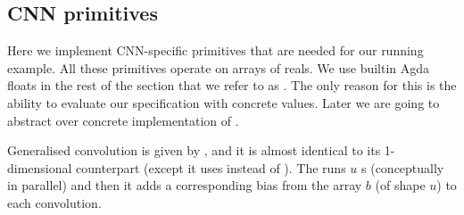 \subsection{CNN primitives\label{sec:ar-cnn-prim}}
Here we implement CNN-specific primitives that are needed for our running example.
All these primitives operate on arrays of reals.  We use builtin Agda floats in
the rest of the section that we refer to as .  The only reason for this
is the ability to evaluate our specification with concrete values.
Later we are going to abstract over concrete implementation of .

Generalised convolution is given by , and it is almost identical to its
1-dimensional counterpart (except it uses  instead of ).
The  runs $u$ s (conceptually in parallel) and then it adds a
corresponding bias from the array $b$ (of shape $u$) to each convolution.
\begin{code}[hide]%
\>[0]\AgdaSpace{}%
\AgdaSpace{}%
\<%
\\
\>[0][@{}l@{\AgdaIndent{0}}]%
\>[2]\AgdaSpace{}%
\AgdaSpace{}%
\AgdaSpace{}%
\AgdaSpace{}%
\AgdaSpace{}%
\AgdaSpace{}%
\AgdaSymbol{(}\AgdaSymbol{)}\<%
\\
%
\>[2]\AgdaSpace{}%
\AgdaSpace{}%
\AgdaSpace{}%
\AgdaSpace{}%
\AgdaSpace{}%
\AgdaSpace{}%
\AgdaSymbol{(}\AgdaPrimitive{\AgdaUnderscore{}+\AgdaUnderscore{}}\AgdaSymbol{;}\AgdaSpace{}%
\AgdaPrimitive{\AgdaUnderscore{}*\AgdaUnderscore{}}\AgdaSymbol{;}\AgdaSpace{}%
\AgdaSymbol{;}\AgdaSpace{}%
\AgdaSymbol{;}\AgdaSpace{}%
\AgdaPrimitive{-\AgdaUnderscore{}}\AgdaSymbol{;}\AgdaSpace{}%
\AgdaSymbol{)}\AgdaSpace{}%
\AgdaSpace{}%
\AgdaSymbol{(}\AgdaSpace{}%
\AgdaSpace{}%
\AgdaSymbol{)}\<%
\\
%
\>[2]\AgdaSpace{}%
\AgdaSpace{}%
\AgdaSpace{}%
\AgdaSpace{}%
\AgdaSpace{}%
\AgdaSpace{}%
\AgdaSymbol{()}\<%
\\
%
\>[2]\AgdaSpace{}%
\AgdaSpace{}%
\AgdaSpace{}%
\AgdaSpace{}%
\AgdaSpace{}%
\AgdaSpace{}%
\AgdaSymbol{(}\AgdaSymbol{;}\AgdaSpace{}%
\AgdaSymbol{;}\AgdaSpace{}%
\AgdaSymbol{;}\AgdaSpace{}%
\AgdaSymbol{;}\AgdaSpace{}%
\AgdaSymbol{;}\AgdaSpace{}%
\AgdaSymbol{;}\AgdaSpace{}%
\AgdaSymbol{;}\AgdaSpace{}%
\AgdaSymbol{)}\<%
\\
%
\>[2]\AgdaSpace{}%
\<%
\end{code}

